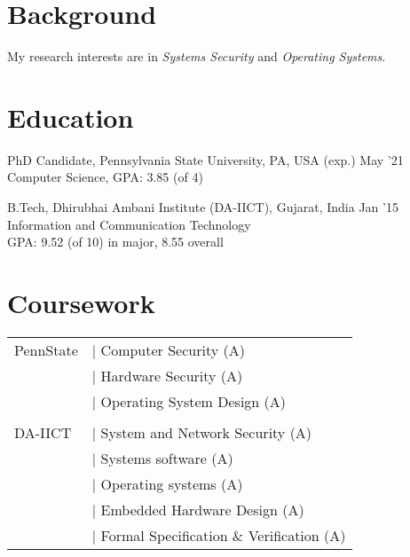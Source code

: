\documentclass[margin]{res}
\begin{document}
\raggedright
{} %

\address{
    blog:// \href{http://adityabasu.me}{adityabasu.me}\\
    github:// \href{https://github.com/mitthu}{mitthu}\\
    linkedIn://  \href{https://www.linkedin.com/in/mitthu}{mitthu}
}

\address{
    W106 Westgate Building\\
    University Park, PA 16802\\
    (814) 862-8300\\
    \href{mailto:aditya.basu@psu.edu}{aditya.basu@psu.edu}
}

\begin{resume} 
\section{Background}
My research interests are in \emph{Systems Security} and \emph{Operating Systems}.

\section{Education}

PhD Candidate, Pennsylvania State University, PA, USA \hfill (exp.) May '21\\
Computer Science, GPA: 3.85 (of 4)

B.Tech, Dhirubhai Ambani Institute (DA-IICT), Gujarat, India \hfill Jan '15\\
Information and Communication Technology\\
GPA: 9.52 (of 10) in major,
8.55 overall 

\section{Coursework}
\begin{tabular}{l p{2.5in}}
PennState   & $\vert$ Computer Security (A)\\
            & $\vert$ Hardware Security (A)\\
            & $\vert$ Operating System Design (A)\\
\\
DA-IICT     & $\vert$ System and Network Security (A)\\
            & $\vert$ Systems software (A)\\
            & $\vert$ Operating systems (A)\\
            & $\vert$ Embedded Hardware Design (A)\\
            & $\vert$ Formal Specification \& Verification (A)
\end{tabular}


\end{resume}
\end{document}
